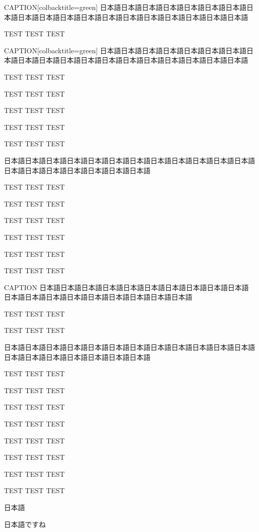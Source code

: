 \clearpage

\begin{rv@clipbox@caption}{CAPTION}[colbacktitle=green]
日本語日本語日本語日本語日本語日本語日本語日本語日本語日本語日本語日本語日本語日本語日本語日本語日本語日本語日本語

TEST TEST TEST

\end{rv@clipbox@caption}

\begin{rv@clipbox@caption}{CAPTION}[colbacktitle=green]
日本語日本語日本語日本語日本語日本語日本語日本語日本語日本語日本語日本語日本語日本語日本語日本語日本語日本語日本語

TEST TEST TEST

TEST TEST TEST

TEST TEST TEST

TEST TEST TEST

TEST TEST TEST

\end{rv@clipbox@caption}

\begin{rv@clipbox@nocaption}
日本語日本語日本語日本語日本語日本語日本語日本語日本語日本語日本語日本語日本語日本語日本語日本語日本語日本語日本語

TEST TEST TEST

TEST TEST TEST

TEST TEST TEST

TEST TEST TEST

TEST TEST TEST

TEST TEST TEST

\end{rv@clipbox@nocaption}

\clearpage

\begin{rv@dottedbox@caption}{CAPTION}
日本語日本語日本語日本語日本語日本語日本語日本語日本語日本語日本語日本語日本語日本語日本語日本語日本語日本語日本語

TEST TEST TEST

TEST TEST TEST

\end{rv@dottedbox@caption}

\begin{rv@dottedbox@nocaption}
日本語日本語日本語日本語日本語日本語日本語日本語日本語日本語日本語日本語日本語日本語日本語日本語日本語日本語日本語

TEST TEST TEST

TEST TEST TEST

TEST TEST TEST

TEST TEST TEST

TEST TEST TEST

TEST TEST TEST

TEST TEST TEST

TEST TEST TEST

日本語

日本語ですね

\end{rv@dottedbox@nocaption}

